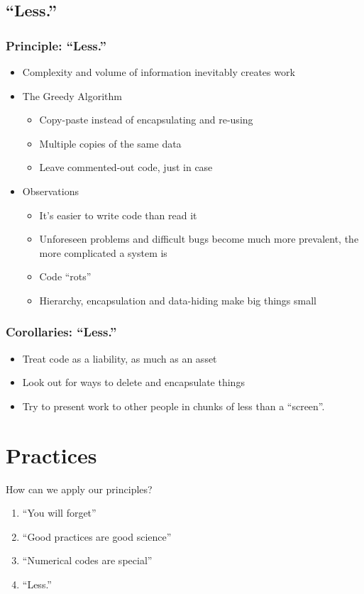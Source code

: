 \documentclass{beamer}
\begin{document}
\subsection{``Less.''}
\begin{frame}[fragile]
\frametitle{Principle: ``Less.''}
\begin{itemize}
\item Complexity and volume of information inevitably creates work
\item The Greedy Algorithm
\begin{itemize}
\item Copy-paste instead of encapsulating and re-using
\item Multiple copies of the same data
\item Leave commented-out code, just in case
\end{itemize}
\item Observations
\begin{itemize}
\item It's easier to write code than read it
\item Unforeseen problems and difficult bugs become much more prevalent, the more complicated a system is
\item Code ``rots''
\item Hierarchy, encapsulation and data-hiding make big things small
\end{itemize}
\end{itemize}
\end{frame}

\begin{frame}[fragile]
\frametitle{Corollaries: ``Less.''}
\begin{itemize}
\item Treat code as a liability, as much as an asset
\item Look out for ways to delete and encapsulate things
\item Try to present work to other people in chunks of less than a ``screen''.
\end{itemize}
\end{frame}

\section{Practices}

\begin{frame}[fragile]
How can we apply our principles?
\begin{enumerate}
\item``You will forget''
\item``Good practices are good science''
\item``Numerical codes are special''
\item``Less.''
\end{enumerate}
\end{frame}
\end{document}
